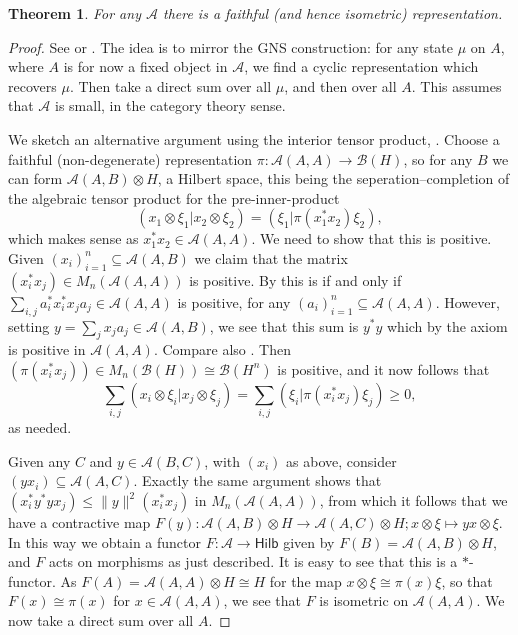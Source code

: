 \documentclass[a4paper,11pt]{article}
\theoremstyle{plain}
\newtheorem{theorem}[proposition]{Theorem}
\theoremstyle{remark}
\newcommand{\mc}[1]{\mathcal{#1}}
\newcommand{\catHilb}{\textsf{Hilb}}
\begin{document}
\begin{theorem}\label{thm:exists_faithful_rep}
For any $\mc A$ there is a faithful (and hence isometric) representation.
\end{theorem}
\begin{proof}
See \cite[Propositions~1.9, 1.14]{GLR_Wstar_categories} or \cite[Section~6]{mitchener_cstar_cats}.  The idea is to mirror the GNS construction: for any state $\mu$ on $A$, where $A$ is for now a fixed object in $\mc A$, we find a cyclic representation which recovers $\mu$.  Then take a direct sum over all $\mu$, and then over all $A$.  This assumes that $\mc A$ is small, in the category theory sense.

We sketch an alternative argument using the interior tensor product, \cite[Chapter~4]{Lance_HilbModsBook}.  Choose a faithful (non-degenerate) representation $\pi\colon\mc A(A,A) \to \mc B(H)$, so for any $B$ we can form $\mc A(A,B) \otimes H$, a Hilbert space, this being the seperation--completion of the algebraic tensor product for the pre-inner-product
\[ (x_1\otimes\xi_1|x_2\otimes\xi_2) = (\xi_1|\pi(x_1^*x_2)\xi_2), \]
which makes sense as $x_1^*x_2\in\mc A(A,A)$.  We need to show that this is positive.  Given $(x_i)_{i=1}^n \subseteq \mc A(A,B)$ we claim that the matrix $(x_i^*x_j)\in M_n(\mc A(A,A))$ is positive.  By \cite[Lemma~IV.3.2]{TakesakiI} this is if and only if $\sum_{i,j} a_i^* x_i^* x_j a_j \in \mc A(A,A)$ is positive, for any $(a_i)_{i=1}^n \subseteq \mc A(A,A)$.  However, setting $y = \sum_j x_j a_j \in \mc A(A,B)$, we see that this sum is $y^*y$ which by the axiom is positive in $\mc A(A,A)$.  Compare also \cite[Lemma~4.2]{Lance_HilbModsBook}.  Then $(\pi(x_i^*x_j)) \in M_n(\mc B(H)) \cong \mc B(H^n)$ is positive, and it now follows that
\[ \sum_{i,j} ( x_i\otimes\xi_i | x_j\otimes\xi_j ) = \sum_{i,j} ( \xi_i | \pi(x_i^*x_j) \xi_j ) \geq 0, \]
as needed.

Given any $C$ and $y\in\mc A(B,C)$, with $(x_i)$ as above, consider $(yx_i) \subseteq \mc A(A,C)$.  Exactly the same argument shows that $(x_i^*y^*yx_j) \leq \|y\|^2 (x_i^*x_j)$ in $M_n(\mc A(A,A))$, from which it follows that we have a contractive map $F(y) : \mc A(A,B) \otimes H \to \mc A(A,C) \otimes H; x\otimes \xi\mapsto yx\otimes\xi$.  In this way we obtain a functor $F \colon \mc A \to \catHilb$ given by $F(B) = \mc A(A,B)\otimes H$, and $F$ acts on morphisms as just described.  It is easy to see that this is a $*$-functor.  As $F(A) = \mc A(A,A)\otimes H \cong H$ for the map $x\otimes\xi \cong \pi(x)\xi$, so that $F(x) \cong \pi(x)$ for $x\in\mc A(A,A)$, we see that $F$ is isometric on $\mc A(A,A)$.  We now take a direct sum over all $A$.
\end{proof}
\end{document}
